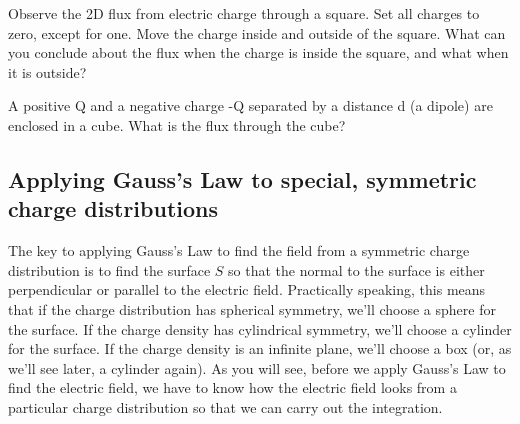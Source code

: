 \documentclass{ximera}
\begin{document}
\begin{example}

Observe the 2D flux from electric charge through a square. Set all charges to zero, except for one. Move the charge inside and outside of the square. What can you conclude about the flux when the charge is inside the square, and what when it is outside?


\begin{center}  
\end{center} 


\end{example} 
 
 
 \begin{question}  
A positive Q and a negative charge -Q separated by a distance d (a dipole) are enclosed in a cube. What is the flux through the cube?
\begin{multipleChoice}  
\end{multipleChoice}  
\end{question} 
 

\subsection{Applying Gauss's Law to special, symmetric charge distributions} 

The key to applying Gauss's Law to find the field from a symmetric charge distribution is to find the surface $S$ so that the normal to the surface is either perpendicular or parallel to the electric field. Practically speaking, this means that if the charge distribution has spherical symmetry, we'll choose a sphere for the surface. If the charge density has cylindrical symmetry, we'll choose a cylinder for the surface. If the charge density is an infinite plane, we'll choose a box (or, as we'll see later, a cylinder again). As you will see, before we apply Gauss's Law to find the electric field, we have to know how the electric field looks from a particular charge distribution so that we can carry out the integration.
\end{document}
